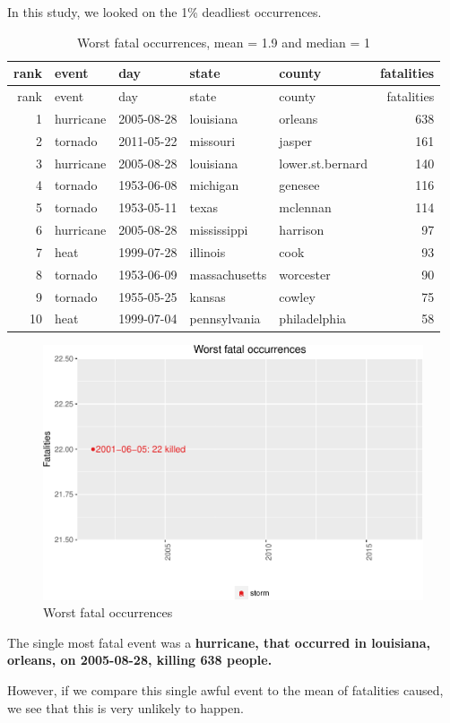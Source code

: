 \documentclass[]{article}
\begin{document}
In this study, we looked on the 1\% deadliest occurrences.

\begin{longtable}[]{@{}rllllr@{}}
\caption{Worst fatal occurrences, mean = 1.9 and median =
1}\tabularnewline
\toprule
rank & event & day & state & county & fatalities\tabularnewline
\midrule
\endfirsthead
\toprule
rank & event & day & state & county & fatalities\tabularnewline
\midrule
\endhead
1 & hurricane & 2005-08-28 & louisiana & orleans & 638\tabularnewline
2 & tornado & 2011-05-22 & missouri & jasper & 161\tabularnewline
3 & hurricane & 2005-08-28 & louisiana & lower.st.bernard &
140\tabularnewline
4 & tornado & 1953-06-08 & michigan & genesee & 116\tabularnewline
5 & tornado & 1953-05-11 & texas & mclennan & 114\tabularnewline
6 & hurricane & 2005-08-28 & mississippi & harrison & 97\tabularnewline
7 & heat & 1999-07-28 & illinois & cook & 93\tabularnewline
8 & tornado & 1953-06-09 & massachusetts & worcester & 90\tabularnewline
9 & tornado & 1955-05-25 & kansas & cowley & 75\tabularnewline
10 & heat & 1999-07-04 & pennsylvania & philadelphia & 58\tabularnewline
\bottomrule
\end{longtable}

\begin{figure}[htbp]
\centering
\includegraphics{readme_files/figure-latex/fatal-plot-single-1.pdf}
\caption{Worst fatal occurrences}
\end{figure}

The single most fatal event was a \textbf{hurricane, that occurred in
louisiana, orleans, on 2005-08-28, killing 638 people.}

However, if we compare this single awful event to the mean of fatalities
caused, we see that this is very unlikely to happen.
\end{document}
